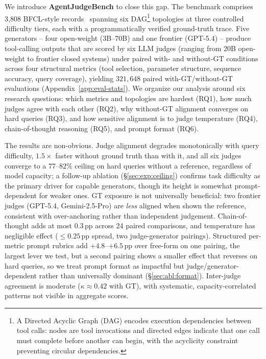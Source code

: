 We introduce \textbf{AgentJudgeBench} to close this gap. The benchmark comprises 3,808 BFCL-style records~\citep{patil2025bfcl} spanning six DAG\footnote{A Directed Acyclic Graph (DAG) encodes execution dependencies between tool calls: nodes are tool invocations and directed edges indicate that one call must complete before another can begin, with the acyclicity constraint preventing circular dependencies.} topologies at three controlled difficulty tiers, each with a programmatically verified ground-truth trace. Five generators -- four open-weight (3B--70B) and one frontier (GPT-5.4) -- produce tool-calling outputs that are scored by six LLM judges (ranging from 20B open-weight to frontier closed systems) under paired with- and without-GT conditions across four structural metrics (tool selection, parameter structure, sequence accuracy, query coverage), yielding $321{,}648$ paired with-GT/without-GT evaluations (Appendix~\ref{app:eval-stats}). We organize our analysis around six research questions: which metrics and topologies are hardest (RQ1), how much judges agree with each other (RQ2), why without-GT alignment converges on hard queries (RQ3), and how sensitive alignment is to judge temperature (RQ4), chain-of-thought reasoning (RQ5), and prompt format (RQ6).

The results are non-obvious. Judge alignment degrades monotonically with query difficulty, $1.5\times$ faster without ground truth than with it, and all six judges converge to a $77$--$82\%$ ceiling on hard queries without a reference, regardless of model capacity; a follow-up ablation (\S\ref{sec:exp:ceiling}) confirms task difficulty as the primary driver for capable generators, though its height is somewhat prompt-dependent for weaker ones. GT exposure is not universally beneficial: two frontier judges (GPT-5.4, Gemini-2.5-Pro) are \emph{less} aligned when shown the reference, consistent with over-anchoring rather than independent judgement. Chain-of-thought adds at most $0.3$\,pp across 24 paired comparisons, and temperature has negligible effect (${\leq}0.25$\,pp spread, two judge-generator pairings). Structured per-metric prompt rubrics add $+4.8$--$+6.5$\,pp over free-form on one pairing, the largest lever we test, but a second pairing shows a smaller effect that reverses on hard queries, so we treat prompt format as impactful but judge/generator-dependent rather than universally dominant (\S\ref{sec:abl:format}). Inter-judge agreement is moderate ($\kappa \approx 0.42$ with GT), with systematic, capacity-correlated patterns not visible in aggregate scores.

